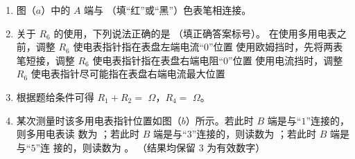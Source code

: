 \begin{enumerate}
\begin{enumerate}
\item
图（$ a $）中的 $ A $ 端与 \underlinegap （填“红”或“黑”）色表笔相连接。


\item 
关于 $ R_{6} $ 的使用，下列说法正确的是 \underlinegap （填正确答案标号）。
\threechoices
{在使用多用电表之前，调整 $ R_{6} $ 使电表指针指在表盘左端电流“$ 0 $”位置}
{使用欧姆挡时，先将两表笔短接，调整 $ R_{6} $ 使电表指针指在表盘右端电阻“$ 0 $”位置}
{使用电流挡时，调整 $ R_{6} $ 使电表指针尽可能指在表盘右端电流最大位置}

\item 
根据题给条件可得 $ R_{1} + R_{2} =$ \underlinegap $ \Omega $，$ R_{4} = $ \underlinegap $ \Omega $。


\item 
某次测量时该多用电表指针位置如图（$ b $）所示。若此时 $ B $ 端是与“$ 1 $”连接的，则多用电表读
数为 \underlinegap ；若此时 $ B $ 端是与“$ 3 $”连接的，则读数为 \underlinegap ；若此时 $ B $ 端是与“$ 5 $”连
接的，则读数为 \underlinegap 。
（结果均保留 $ 3 $ 为有效数字）



\end{enumerate}









\end{enumerate}


